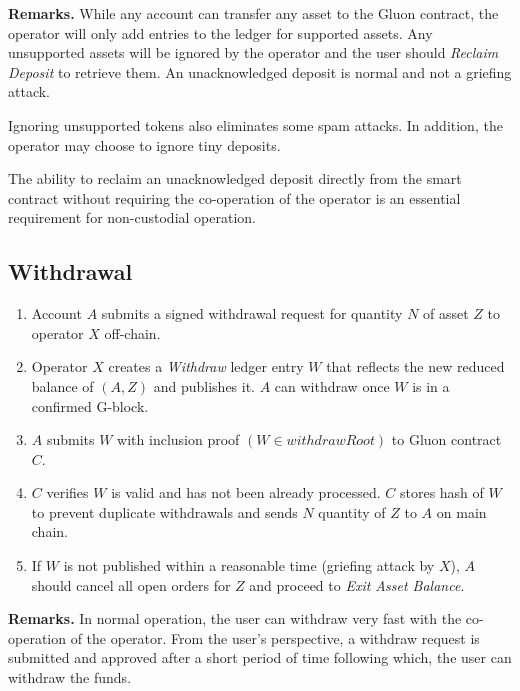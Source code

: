 \documentclass[12pt,a4paper]{article}
\begin{document}
\textbf{Remarks.}
While any account can transfer any asset to the Gluon contract, the operator will only add entries to the ledger for supported assets. Any unsupported assets will be ignored by the operator and the user should \emph{Reclaim Deposit} to retrieve them. An unacknowledged deposit is normal and not a griefing attack.

Ignoring unsupported tokens also eliminates some spam attacks. In addition, the operator may choose to ignore tiny deposits.

The ability to reclaim an unacknowledged deposit directly from the smart contract without requiring the co-operation of the operator is an essential requirement for non-custodial operation.

\subsection{Withdrawal}\label{gp:withdrawal}
\begin{mdframed}
\begin{enumerate}
    \item Account $A$ submits a signed withdrawal request for quantity $N$ of asset $Z$ to operator $X$ off-chain.
    \item Operator $X$ creates a \emph{Withdraw} ledger entry $W$ that reflects the new reduced balance of \((A, Z)\) and publishes it. $A$ can withdraw once $W$ is in a confirmed G-block.
    \item $A$ submits $W$ with inclusion proof \((W \in withdrawRoot)\) to Gluon contract $C$.
    \item $C$ verifies $W$ is valid and has not been already processed. $C$ stores hash of $W$ to prevent duplicate withdrawals and sends $N$ quantity of $Z$ to $A$ on main chain.
    \item If $W$ is not published within a reasonable time (griefing attack by $X$), $A$ should cancel all open orders for $Z$ and proceed to \emph{Exit Asset Balance}.
\end{enumerate}
\end{mdframed}


\textbf{Remarks.}
In normal operation, the user can withdraw very fast with the co-operation of the operator. From the user’s perspective, a withdraw request is submitted and approved after a short period of time following which, the user can withdraw the funds.
\end{document}
